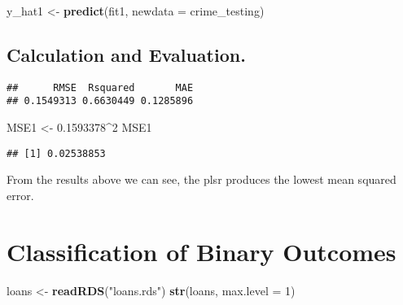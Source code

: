 \documentclass[]{article}
\newenvironment{Shaded}{\begin{snugshade}}{\end{snugshade}}
\newcommand{\KeywordTok}[1]{\textcolor[rgb]{0.13,0.29,0.53}{\textbf{#1}}}
\newcommand{\DataTypeTok}[1]{\textcolor[rgb]{0.13,0.29,0.53}{#1}}
\newcommand{\DecValTok}[1]{\textcolor[rgb]{0.00,0.00,0.81}{#1}}
\newcommand{\FloatTok}[1]{\textcolor[rgb]{0.00,0.00,0.81}{#1}}
\newcommand{\StringTok}[1]{\textcolor[rgb]{0.31,0.60,0.02}{#1}}
\newcommand{\OperatorTok}[1]{\textcolor[rgb]{0.81,0.36,0.00}{\textbf{#1}}}
\newcommand{\NormalTok}[1]{#1}
\begin{document}
\begin{Shaded}
\begin{Highlighting}[]
\NormalTok{y_hat1 <-}\StringTok{ }\KeywordTok{predict}\NormalTok{(fit1, }\DataTypeTok{newdata =}\NormalTok{ crime_testing)}
\end{Highlighting}
\end{Shaded}

\subsection{Calculation and
Evaluation.}\label{calculation-and-evaluation.-1}

\begin{Shaded}
\end{Shaded}

\begin{verbatim}
##      RMSE  Rsquared       MAE 
## 0.1549313 0.6630449 0.1285896
\end{verbatim}

\begin{Shaded}
\begin{Highlighting}[]
\NormalTok{MSE1 <-}\StringTok{ }\FloatTok{0.1593378}\OperatorTok{^}\DecValTok{2}
\NormalTok{MSE1}
\end{Highlighting}
\end{Shaded}

\begin{verbatim}
## [1] 0.02538853
\end{verbatim}

From the results above we can see, the plsr produces the lowest mean
squared error.

\section{Classification of Binary
Outcomes}\label{classification-of-binary-outcomes}

\begin{Shaded}
\begin{Highlighting}[]
\NormalTok{loans <-}\StringTok{ }\KeywordTok{readRDS}\NormalTok{(}\StringTok{"loans.rds"}\NormalTok{)}
\KeywordTok{str}\NormalTok{(loans, }\DataTypeTok{max.level =} \DecValTok{1}\NormalTok{)}
\end{Highlighting}
\end{Shaded}
\end{document}
